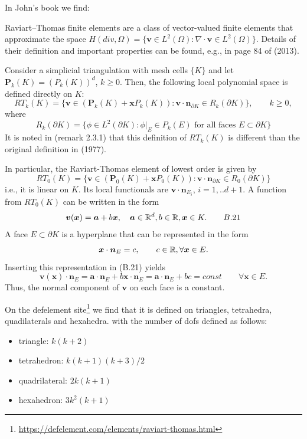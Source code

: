 In John's book \cite{john16} we find:
\begin{displayquote}
{\color{darkgray}
Raviart–Thomas finite elements are a class of vector-valued finite elements that approximate the space
$H(div,\Omega)=\{ {\bm v} \in L^2(\Omega): \nabla \cdot {\bm v} \in L^2(\Omega)  \}$.
Details of their definition and important properties can be
found, e.g., in page 84 of \textcite{bobf13} (2013).

Consider a simplicial triangulation with mesh cells $\{K\}$ and let ${\bm P}_k(K)=(P_k(K))^d$, $k\ge 0$.
Then, the following local polynomial space is defined directly on $K$:
\[
RT_k(K)=\{ {\bm v} \in ({\bm P}_k(K) + {\bm x} P_k(K)) : {\bm v}\cdot{\bm n}_{\partial K} \in R_k(\partial K)\},
\qquad k\ge 0,
\]
where
\[
R_k(\partial K)=\{ \phi \in L^2(\partial K): \phi|_E\in P_k(E) \text{ for all faces } E\subset \partial K \}
\]
It is noted in \textcite{bobf13} (remark 2.3.1) that this definition of $RT_k(K)$
is different than the original definition in \textcite{rath77} (1977).

In particular, the Raviart-Thomas element of lowest order is given by
\[
RT_0(K)=\{ {\bm v} \in ({\bm P}_0(K)+{\bm x} P_0(K)) : {\bm v} \cdot {\bm n}_{\partial K} \in R_0(\partial K)  \}
\]
i.e., it is linear on $K$. Its local functionals are ${\bm v} \cdot {\bm n}_{E_i}$, $i=1,..d+1$. 
A function from $RT_0(K)$ can be written in the form
\[
{\bm v}({\bm x}) = {\bm a} + b {\bm x}, \quad {\bm a}\in {\mathbb{R}}^d, b\in {\mathbb{R}}, {\bm x}\in K. \qquad B.21
\]
A face $E\subset \partial K$ is a hyperplane that can be represented in the form
\[
{\bm x}\cdot {\bm n}_E = c, \qquad c\in {\mathbb{R}}, \forall {\bm x} \in E.
\]
Inserting this representation in (B.21) yields
\[
{\bm v}({\bm x})\cdot {\bm n}_E = {\bm a}\cdot {\bm n}_E + b {\bm x} \cdot {\bm n}_E = {\bm a}\cdot {\bm n}_E + bc =const
\qquad \forall {\bm x}\in E.
\]
Thus, the normal component of ${\bm v}$ on each face is a constant.

}
\end{displayquote}



On the defelement site\footnote{\url{https://defelement.com/elements/raviart-thomas.html}} we find 
that it is defined on triangles, tetrahedra, quadilaterals and hexahedra.
with the number of dofs defined as follows:
\begin{itemize}
\item triangle: $k(k+2)$
\item tetrahedron: $k(k+1)(k+3)/2$
\item quadrilateral: $2k(k+1)$
\item hexahedron: $3k^2(k+1)$
\end{itemize}



